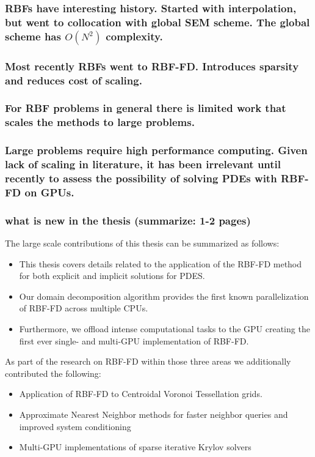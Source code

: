 \subsubsection{ RBFs have interesting history. Started with interpolation, but went to collocation with global SEM scheme. The global scheme has $O(N^{2})$ complexity.}

\subsubsection{Most recently RBFs went to RBF-FD. Introduces sparsity and reduces cost of scaling.}


\subsubsection{For RBF problems in general there is limited work that scales the methods to large problems.}


\subsubsection{Large problems require high performance computing. Given lack of scaling in literature, it has been irrelevant until recently to assess the possibility of solving PDEs with RBF-FD on GPUs.}

\subsubsection{what is new in the thesis (summarize: 1-2 pages)}

The large scale contributions of this thesis can be summarized as follows: 
\begin{itemize} 
\item This thesis covers details related to the application of the RBF-FD method for both explicit and implicit solutions for PDES. 
\item Our domain decomposition algorithm provides the first known parallelization of RBF-FD across multiple CPUs.
\item Furthermore, we offload intense computational tasks to the GPU creating the first ever single- and multi-GPU implementation of RBF-FD. 
\end{itemize}
As part of the research on RBF-FD within those three areas we additionally contributed the following: 
\begin{itemize} 
\item Application of RBF-FD to Centroidal Voronoi Tessellation grids. 
\item Approximate Nearest Neighbor methods for faster neighbor queries and improved system conditioning
\item Multi-GPU implementations of sparse iterative Krylov solvers
\end{itemize} 


